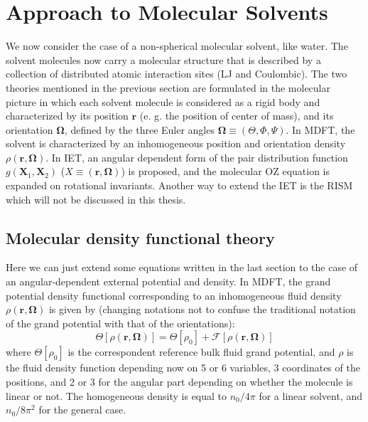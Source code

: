 
\chapter{Approach to Molecular Solvents\label{chpt:iem-mdft}}

We now consider the case of a non-spherical molecular solvent, like
water. The solvent molecules now carry a molecular structure that
is described by a collection of distributed atomic interaction sites
(LJ and Coulombic). The two theories mentioned in the previous section
are formulated in the molecular picture in which each solvent molecule
is considered as a rigid body and characterized by its position $\mathbf{r}$
(e. g. the position of center of mass), and its orientation $\mathbf{\Omega}$,
defined by the three Euler angles $\mathbf{\Omega}\equiv(\Theta,\Phi,\Psi)$.
In \acs{MDFT}, the solvent is characterized by an inhomogeneous position
and orientation density $\rho(\mathbf{r},\mathbf{\Omega})$. In \acs{IET},
an angular dependent form of the pair distribution function $g(\mathbf{X}_{1},\mathbf{X}_{2})$
($X\equiv(\mathbf{r},\mathbf{\Omega})$) is proposed, and the molecular
\acs{OZ} equation is expanded on rotational invariants. Another way
to extend the IET is the RISM \citep{hirata_molecular_2004} which
will not be discussed in this thesis.

\section{Molecular density functional theory}

Here we can just extend some equations written in the last section
to the case of an angular-dependent external potential and density.
In \acf{MDFT}, the grand potential density functional corresponding
to an inhomogeneous fluid density $\rho(\mathbf{r},\mathbf{\Omega})$
is given by (changing notations not to confuse the traditional notation
of the grand potential with that of the orientations):
\begin{equation}
\Theta[\rho(\mathbf{r},\mathbf{\Omega})]=\Theta[\rho_{0}]+\mathcal{F}[\rho(\mathbf{r},\mathbf{\Omega})]
\end{equation}
where $\Theta[\rho_{0}]$ is the correspondent reference bulk fluid
grand potential, and $\rho$ is the fluid density function depending
now on 5 or 6 variables, 3 coordinates of the positions, and 2 or
3 for the angular part depending on whether the molecule is linear
or not. The homogeneous density is equal to $n_{0}/4\pi$ for a linear
solvent, and $n_{0}/8\pi^{2}$ for the general case.

